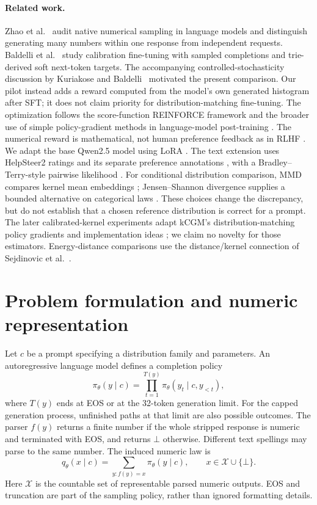 \documentclass[11pt,letterpaper]{article}
\begin{document}
\paragraph{Related work.}
Zhao et al.\ \cite{zhao2026dice} audit native numerical sampling in language
models and distinguish generating many numbers within one response from
independent requests. Baldelli et al.\ \cite{baldelli2026calibration} study
calibration fine-tuning with sampled completions and trie-derived soft
next-token targets. The accompanying controlled-stochasticity discussion by
Kuriakose and Baldelli\ \cite{kuriakose2026blog} motivated the present comparison.
Our pilot instead adds a reward computed from the model's own generated
histogram after SFT; it does not claim priority for distribution-matching
fine-tuning. The optimization follows the score-function REINFORCE framework
\cite{williams1992} and the broader use of simple policy-gradient methods in
language-model post-training \cite{ahmadian2024}. The numerical reward is mathematical,
not human preference feedback as in RLHF \cite{ouyang2022}. We adapt the base
Qwen2.5 model \cite{qwen2025} using LoRA \cite{hu2021lora}. The text
extension uses HelpSteer2 ratings and its separate preference annotations
\cite{wang2024helpsteer,wang2024preference}, with a Bradley--Terry-style
pairwise likelihood \cite{bradley1952}.
For conditional distribution comparison, MMD compares kernel mean
embeddings \cite{gretton2012}; Jensen--Shannon divergence supplies a
bounded alternative on categorical laws \cite{lin1991}. These choices
change the discrepancy, but do not establish that a chosen reference
distribution is correct for a prompt.
The later calibrated-kernel experiments adapt kCGM's distribution-matching
policy gradients and implementation ideas \cite{diamant2026kcgm,kcgmcode};
we claim no novelty for those estimators. Energy-distance comparisons
use the distance/kernel connection of Sejdinovic et al.\ \cite{sejdinovic2013}.

\section{Problem formulation and numeric representation}
Let $c$ be a prompt specifying a distribution family and parameters. An
autoregressive language model defines a completion policy
\begin{equation}
 \pi_\theta(y\mid c)=\prod_{t=1}^{T(y)}
 \pi_\theta(y_t\mid c,y_{<t}),
 \label{eq:policy}
\end{equation}
where $T(y)$ ends at EOS or at the 32-token generation limit. For the capped
generation process, unfinished paths at that limit are also possible outcomes.
The parser $f(y)$ returns a finite number if the whole stripped response is
numeric and terminated with EOS, and returns $\bot$ otherwise. Different text
spellings may parse to the same number. The induced numeric law is
\begin{equation}
 q_\theta(x\mid c)=\sum_{y:f(y)=x}\pi_\theta(y\mid c),
 \qquad x\in\mathcal X\cup\{\bot\}.
 \label{eq:induced}
\end{equation}
Here $\mathcal X$ is the countable set of representable parsed numeric outputs.
EOS and truncation are part of the sampling policy, rather than ignored
formatting details.
\end{document}
